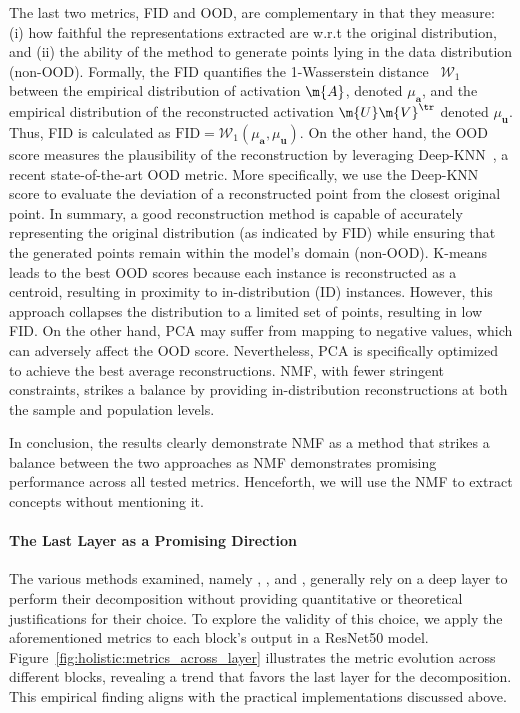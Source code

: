 The last two metrics, FID and OOD, are complementary in that they measure: (i) how faithful the representations extracted are w.r.t the original distribution, and (ii) the ability of the method to generate points lying in the data distribution (non-OOD).
Formally, the FID quantifies the 1-Wasserstein distance~\cite{villani2009optimal} $\mathcal{W}_1$ between the empirical distribution of activation $\m{A}$, denoted $\mu_{\bm{a}}$, and the empirical distribution of the reconstructed activation $\m{U}\m{V}^\tr$ denoted $\mu_{\bm{u}}$. Thus, FID is calculated as $\text{FID} = \mathcal{W}_1(\mu_{\bm{a}}, \mu_{\bm{u}})$.
On the other hand, the OOD score measures the plausibility of the reconstruction by leveraging Deep-KNN~\cite{sun2022out}, a recent state-of-the-art OOD metric. More specifically,  we use the Deep-KNN score to evaluate the deviation of a reconstructed point from the closest original point. In summary, a good reconstruction method is capable of accurately representing the original distribution (as indicated by FID) while ensuring that the generated points remain within the model's domain (non-OOD). 
K-means leads to the best OOD scores because each instance is reconstructed as a centroid, resulting in proximity to in-distribution (ID) instances. However, this approach collapses the distribution to a limited set of points, resulting in low FID. On the other hand, PCA may suffer from mapping to negative values, which can adversely affect the OOD score. Nevertheless, PCA is specifically optimized to achieve the best average reconstructions. NMF, with fewer stringent constraints, strikes a balance by providing in-distribution reconstructions at both the sample and population levels.

In conclusion, the results clearly demonstrate NMF as a method that strikes a balance between the two approaches as NMF demonstrates promising performance across all tested metrics. Henceforth, we will use the NMF to extract concepts without mentioning it.



\paragraph{The Last Layer as a Promising Direction}
The various methods examined, namely \ACE, \ICE, and \CRAFT, generally rely on a deep layer to perform their decomposition without providing quantitative or theoretical justifications for their choice. 
To explore the validity of this choice, we apply the aforementioned metrics to each block's output in a ResNet50 model.
Figure~\ref{fig:holistic:metrics_across_layer} illustrates the metric evolution across different blocks, revealing a trend that favors the last layer for the decomposition. This empirical finding aligns with the practical implementations discussed above.


